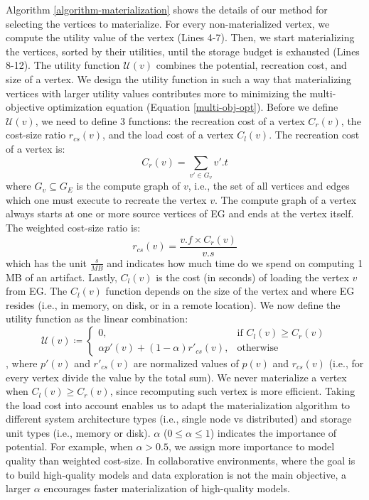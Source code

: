 Algorithm \ref{algorithm-materialization} shows the details of our method for selecting the vertices to materialize.
For every non-materialized vertex, we compute the utility value of the vertex (Lines 4-7).
Then, we start materializing the vertices, sorted by their utilities, until the storage budget is exhausted (Lines 8-12).
The utility function $\mathcal{U}(v)$ combines the potential, recreation cost, and size of a vertex.
We design the utility function in such a way that materializing vertices with larger utility values contributes more to minimizing the multi-objective optimization equation (Equation \ref{multi-obj-opt}).
Before we define $\mathcal{U}(v)$, we need to define 3 functions: the recreation cost of a vertex $C_r(v)$, the cost-size ratio $r_{cs}(v)$, and the load cost of a vertex $C_l(v)$.
The recreation cost of a vertex is:
\[
C_r(v) = \sum\limits_{v' \in G_v} v'.t
\] 
where $G_v \subseteq G_E$ is the compute graph of $v$, i.e., the set of all vertices and edges which one must execute to recreate the vertex $v$.
The compute graph of a vertex always starts at one or more source vertices of EG and ends at the vertex itself.
The weighted cost-size ratio is:
\[r_{cs}(v) = \frac{v.f  \times C_r(v)}{v.s}\]
which has the unit $\tfrac{s}{MB}$ and indicates how much time do we spend on computing 1 MB of an artifact.
Lastly, $C_l(v)$ is the cost (in seconds) of loading the vertex $v$ from EG.
The $C_l(v)$ function depends on the size of the vertex and where EG resides (i.e., in memory, on disk, or in a remote location).
We now define the utility function as the linear combination: 
\begin{equation}\label{utility-function}
\mathcal{U}(v) \coloneqq  	
		\begin{cases}
		0, & \text{if }  C_l(v) \ge C_r(v)  \\ 
		\alpha p'(v) + (1-\alpha)r'_{cs}(v), & \text{otherwise}
		\end{cases}
\end{equation},
where $p'(v)$ and $r'_{cs}(v)$ are normalized values of $p(v)$ and $r_{cs}(v)$ (i.e., for every vertex divide the value by the total sum).
We never materialize a vertex when $C_l(v) \ge C_r(v)$, since recomputing such vertex is more efficient.
Taking the load cost into account enables us to adapt the materialization algorithm to different system architecture types (i.e., single node vs distributed) and storage unit types (i.e., memory or disk).
$ \alpha$ ($0 \leq \alpha \leq 1$) indicates the importance of potential.
For example, when $\alpha > 0.5$, we assign more importance to model quality than weighted cost-size.
In collaborative environments, where the goal is to build high-quality models and data exploration is not the main objective, a larger $\alpha$ encourages faster materialization of high-quality models.

